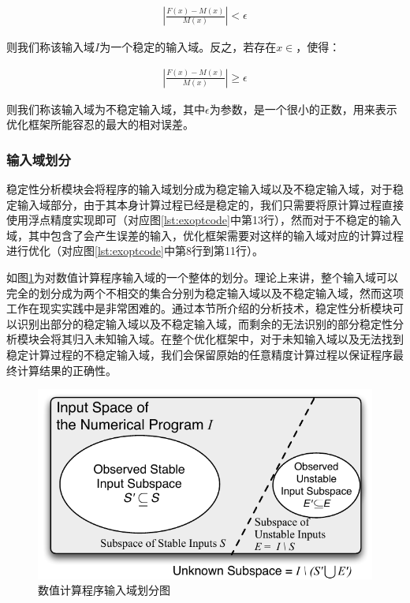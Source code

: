 \begin{align}
  |\frac{F(x)-M(x)}{M(x)}| < \epsilon
\end{align}

则我们称该输入域$I$为一个稳定的输入域。反之，若存在$x \in $，使得：

\begin{align}
  |\frac{F(x)-M(x)}{M(x)}| \geq \epsilon
\end{align}

则我们称该输入域为不稳定输入域，其中$\epsilon$为参数，是一个很小的正数，用来表示优化框架所能容忍的最大的相对误差。

\subsubsection{输入域划分}

稳定性分析模块会将程序的输入域划分成为稳定输入域以及不稳定输入域，对于稳定输入域部分，由于其本身计算过程已经是稳定的，我们只需要将原计算过程直接使用浮点精度实现即可（对应图\ref{lst:exoptcode}中第13行），然而对于不稳定的输入域，其中包含了会产生误差的输入，优化框架需要对这样的输入域对应的计算过程进行优化（对应图\ref{lst:exoptcode}中第8行到第11行）。

如图\ref{fig:inputspace}为对数值计算程序输入域的一个整体的划分。理论上来讲，整个输入域可以完全的划分成为两个不相交的集合分别为稳定输入域以及不稳定输入域，然而这项工作在现实实践中是非常困难的。通过本节所介绍的分析技术，稳定性分析模块可以识别出部分的稳定输入域以及不稳定输入域，而剩余的无法识别的部分稳定性分析模块会将其归入未知输入域。在整个优化框架中，对于未知输入域以及无法找到稳定计算过程的不稳定输入域，我们会保留原始的任意精度计算过程以保证程序最终计算结果的正确性。

\begin{figure}[tb]
  \centering
  \includegraphics[width=\columnwidth]{fig/InputSpace.pdf}
  \vspace*{1mm}
  \caption{数值计算程序输入域划分图} \label{fig:inputspace} %
\end{figure}

